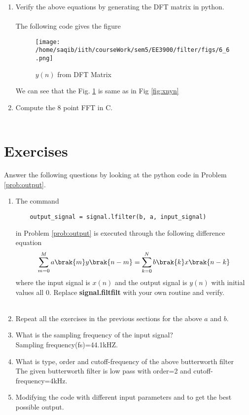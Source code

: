 \documentclass[journal,12pt,twocolumn]{IEEEtran}
\renewcommand\thesection{\arabic{section}}
\begin{document}
\begin{enumerate}[label=\thesection.\arabic*]
\item Verify the above equations by generating the DFT matrix in python.
\\\solution\\
The following code gives the figure

\begin{figure}[!ht]
	\centering
	\texttt{[image: /home/saqib/iith/courseWork/sem5/EE3900/filter/figs/6\_6.png]}
	\caption{$y(n)$ from DFT Matrix}
	\label{fig:yndftmat}
	\end{figure}
We can see that the Fig. \ref{fig:yndftmat} is same as in Fig \ref{fig:xnyn}
\item Compute the 8 point FFT in C.
\\\solution\\

\end{enumerate}
%
\section{Exercises}

Answer the following questions by looking at the python code in Problem \ref{prob:output}.
\begin{enumerate}[label=\thesection.\arabic*]
\item
The command
\begin{lstlisting}
	output_signal = signal.lfilter(b, a, input_signal)
	\end{lstlisting}
in Problem \ref{prob:output} is executed through the following difference equation
\begin{equation}
\label{eq:iir_filter_gen}
 \sum _{m=0}^{M}a\brak{m}y\brak{n-m}=\sum _{k=0}^{N}b\brak{k}x\brak{n-k}
\end{equation}
%
where the input signal is $x(n)$ and the output signal is $y(n)$ with initial values all 0. Replace
\textbf{signal.filtfilt} with your own routine and verify.
\\\solution\\

%
\item Repeat all the exercises in the previous sections for the above $a$ and $b$.

\item What is the sampling frequency of the input signal?
\\
\solution
Sampling frequency(fs)=44.1kHZ.
\item
What is type, order and  cutoff-frequency of the above butterworth filter
\\
\solution
The given butterworth filter is low pass with order=2 and cutoff-frequency=4kHz.
%
\item
Modifying the code with different input parameters and to get the best possible output.
%
\end{enumerate}
\end{document}
